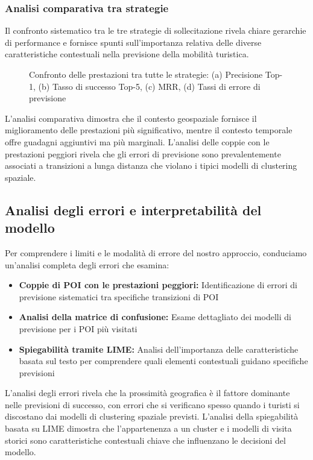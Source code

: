 \documentclass[12pt,a4paper]{article}
\begin{document}
\subsubsection{Analisi comparativa tra strategie}

Il confronto sistematico tra le tre strategie di sollecitazione rivela chiare gerarchie di performance e fornisce spunti sull'importanza relativa delle diverse caratteristiche contestuali nella previsione della mobilità turistica.

\begin{figure}[h]
\centering
\caption{Confronto delle prestazioni tra tutte le strategie: (a) Precisione Top-1, (b) Tasso di successo Top-5, (c) MRR, (d) Tassi di errore di previsione}
\label{fig:strategy_comparison_detailed}
\end{figure}

L'analisi comparativa dimostra che il contesto geospaziale fornisce il miglioramento delle prestazioni più significativo, mentre il contesto temporale offre guadagni aggiuntivi ma più marginali. L'analisi delle coppie con le prestazioni peggiori rivela che gli errori di previsione sono prevalentemente associati a transizioni a lunga distanza che violano i tipici modelli di clustering spaziale.

\subsection{Analisi degli errori e interpretabilità del modello}

Per comprendere i limiti e le modalità di errore del nostro approccio, conduciamo un'analisi completa degli errori che esamina:

\begin{itemize}
\item \textbf{Coppie di POI con le prestazioni peggiori:} Identificazione di errori di previsione sistematici tra specifiche transizioni di POI
\item \textbf{Analisi della matrice di confusione:} Esame dettagliato dei modelli di previsione per i POI più visitati
\item \textbf{Spiegabilità tramite LIME:} Analisi dell'importanza delle caratteristiche basata sul testo per comprendere quali elementi contestuali guidano specifiche previsioni
\end{itemize}

L'analisi degli errori rivela che la prossimità geografica è il fattore dominante nelle previsioni di successo, con errori che si verificano spesso quando i turisti si discostano dai modelli di clustering spaziale previsti. L'analisi della spiegabilità basata su LIME dimostra che l'appartenenza a un cluster e i modelli di visita storici sono caratteristiche contestuali chiave che influenzano le decisioni del modello.
\end{document}
